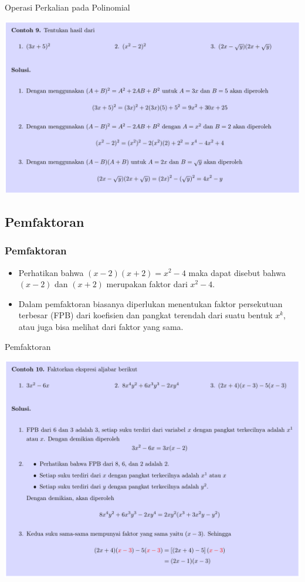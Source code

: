 \documentclass[pdflatex,compress,mathserif]{beamer}
\begin{document}
\begin{frame}{Operasi Perkalian pada Polinomial}
	\begin{center}
		\includegraphics[width=\linewidth]{img/img24}
	\end{center}
\end{frame}

\subsection{Pemfaktoran}

\begin{frame}
	\frametitle{Pemfaktoran}
	\begin{itemize}
		\item Perhatikan bahwa $(x - 2)(x + 2) = x^2 - 4$ maka dapat disebut bahwa $(x - 2)$ dan $(x + 2)$ merupakan faktor dari $x^2 - 4$.
		\item Dalam pemfaktoran biasanya diperlukan menentukan faktor persekutuan terbesar (FPB) dari koefisien dan pangkat terendah dari suatu bentuk $x^k$, atau juga bisa melihat dari faktor yang sama.
	\end{itemize}
\end{frame}

\begin{frame}{Pemfaktoran}
	\begin{center}
		\includegraphics[width=0.9\linewidth]{img/img25}
	\end{center}
\end{frame}
\end{document}
